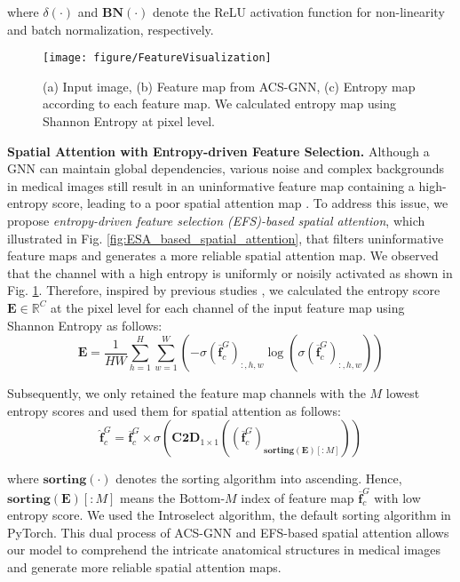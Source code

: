 \noindent where $\delta( \cdot )$ and $\textbf{BN} (\cdot)$ denote the ReLU activation function for non-linearity and batch normalization, respectively.
\begin{figure}[t]
    \centering
    \texttt{[image: figure/FeatureVisualization]}
    \caption{(a) Input image, (b) Feature map from ACS-GNN, (c) Entropy map according to each feature map. We calculated entropy map using Shannon Entropy at pixel level.}
    \label{fig:FeatureVisualization}
\end{figure}

\noindent \textbf{Spatial Attention with Entropy-driven Feature Selection.} Although a GNN can maintain global dependencies, various noise and complex backgrounds in medical images still result in an uninformative feature map containing a high-entropy score, leading to a poor spatial attention map \cite{chen2021lesion, shawn2024ct}. To address this issue, we propose \textit{entropy-driven feature selection (EFS)-based spatial attention}, which illustrated in Fig. \ref{fig:ESA_based_spatial_attention}, that filters uninformative feature maps and generates a more reliable spatial attention map. We observed that the channel with a high entropy is uniformly or noisily activated as shown in Fig. \ref{fig:FeatureVisualization}. Therefore, inspired by previous studies \cite{vu2019advent, wang2019boundary}, we calculated the entropy score $\mathbf{E} \in \mathbb{R}^{C}$ at the pixel level for each channel of the input feature map using Shannon Entropy as follows:
\begin{equation}
    \mathbf{E} = \frac{1}{HW} \sum_{h = 1}^{H} \sum_{w = 1}^{W} (-\sigma(\overline{\mathbf{f}}^{G}_{c})_{:, h, w} \log (\sigma(\overline{\mathbf{f}}^{G}_{c})_{:, h, w}))
\end{equation}

\noindent Subsequently, we only retained the feature map channels with the $M$ lowest entropy scores and used them for spatial attention as follows:
\begin{equation}
    \hat{\mathbf{f}}^{G}_{c} = \overline{\mathbf{f}}^{G}_{c} \times \sigma(\textbf{C2D}_{1 \times 1} ((\overline{\mathbf{f}}^{G}_{c})_{\textbf{sorting} \left(  \mathbf{E} \right)[: M]}))
\end{equation}

\noindent where $\textbf{sorting}(\cdot)$ denotes the sorting algorithm into ascending. Hence, $\textbf{sorting} \left(  \mathbf{E} \right)[: M]$ means the Bottom-$M$ index of feature map $\overline{\mathbf{f}}^{G}_{c}$ with low entropy score. We used the Introselect algorithm, the default sorting algorithm in PyTorch. This dual process of ACS-GNN and EFS-based spatial attention allows our model to comprehend the intricate anatomical structures in medical images and generate more reliable spatial attention maps.

